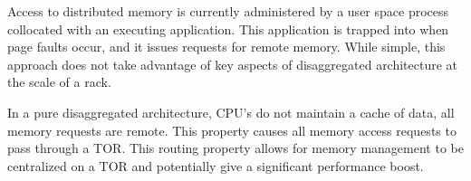 Access to distributed memory is
currently administered by a user space process collocated with an
executing application. This application is trapped into when page
faults occur, and it issues requests for remote memory. While
simple, this approach does not take advantage of key aspects of
disaggregated architecture at the scale of a rack.

In a pure disaggregated architecture, CPU’s do not maintain a cache of
data, all memory requests are remote. This property causes all memory
access requests to pass through a TOR. This routing property allows
for memory management to be centralized on a TOR and potentially give
a significant performance boost.
